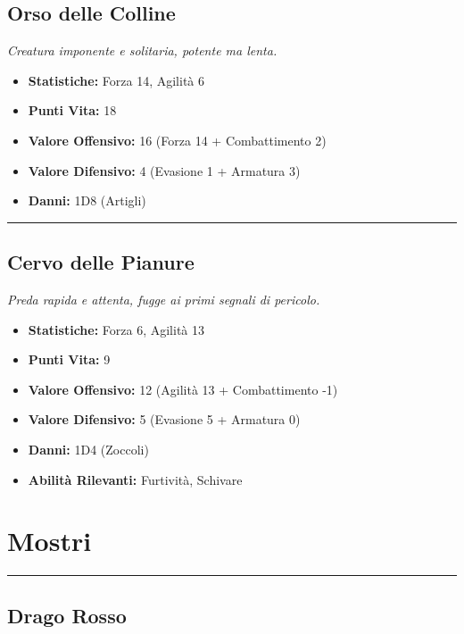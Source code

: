 \documentclass[../manuale_main.tex]{subfiles}
\begin{document}
\subsection*{Orso delle Colline}

\textit{Creatura imponente e solitaria, potente ma lenta.}
\begin{itemize}
\item \textbf{Statistiche:} Forza 14, Agilità 6
\item \textbf{Punti Vita:} 18
\item \textbf{Valore Offensivo:} 16 (Forza 14 + Combattimento 2)
\item \textbf{Valore Difensivo:} 4 (Evasione 1 + Armatura 3)
\item \textbf{Danni:} 1D8 (Artigli)
\end{itemize}
\vspace{0.2cm}
\noindent
\begin{center}
\rule{\textwidth}{0.4pt} 
\end{center}
\clearpage
\subsection*{Cervo delle Pianure}
\textit{Preda rapida e attenta, fugge ai primi segnali di pericolo.}
\begin{itemize}
\item \textbf{Statistiche:} Forza 6, Agilità 13
\item \textbf{Punti Vita:} 9
\item \textbf{Valore Offensivo:} 12 (Agilità 13 + Combattimento -1)
\item \textbf{Valore Difensivo:} 5 (Evasione 5 + Armatura 0)
\item \textbf{Danni:} 1D4 (Zoccoli)
\item \textbf{Abilità Rilevanti:} Furtività, Schivare
\end{itemize}

\vspace{0.5cm}
\section*{Mostri}

\vspace{0.2cm}
\noindent
\begin{center}
\rule{\textwidth}{0.4pt} 
\end{center}
\vspace{0.2cm}

\subsection*{Drago Rosso}
\vspace{0.2cm}
\end{document}
